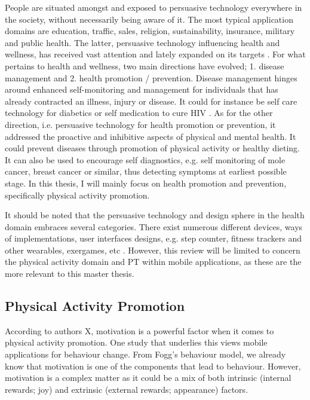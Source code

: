 People are situated amongst and exposed to persuasive technology everywhere in the society, without necessarily being aware of it. The most typical application domains are education, traffic, sales, religion, sustainability, insurance, military and public health. The latter, persuasive technology influencing health and wellness, has received vast attention and lately expanded on its targets \cite{orji_persuasive_2018}.
For what pertains to health and wellness, two main directions have evolved; 1. disease management and 2. health promotion / prevention. Disease management hinges around enhanced self-monitoring and management for individuals that has already contracted an illness, injury or disease. It could for instance be self care technology for diabetics \cite{rouyard_nudging_2018}
or self medication to cure HIV \cite{schnall_mhealth_2015}.
As for the other direction, i.e. persuasive technology for health promotion or prevention, it addressed the proactive and inhibitive aspects of physical and mental health. It could prevent diseases through promotion of physical activity or healthy dieting. It can also be used to encourage self diagnostics, e.g. self monitoring of mole cancer, breast cancer or similar, thus detecting symptoms at earliest  possible stage. In this thesis, I will mainly focus on health promotion and prevention, specifically physical activity promotion. 

It should be noted that the persuasive technology and design sphere in the health domain embraces several categories. There exist numerous different devices, ways of implementations, user interfaces designs, e.g. step counter, fitness trackers and other wearables, exergames, etc \cite{maitland_technological_2009}.
However, this review will be limited to concern the physical activity domain and PT within mobile applications, as these are the more relevant to this master thesis. 

\subsection{Physical Activity Promotion}
According to authors X, motivation is a powerful factor when it comes to physical activity promotion. One study that underlies this \cite{hamper_behavior_2016}
views mobile applications for behaviour change. From Fogg's behaviour model, we already know that motivation is one of the components that lead to behaviour. However, motivation is a complex matter as it could be a mix of both intrinsic (internal rewards; joy) and extrinsic (external rewards; appearance) factors. 

